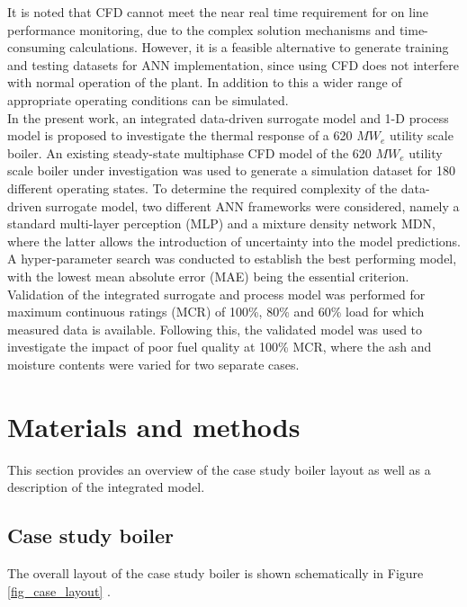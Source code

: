 \documentclass[a4paper,fleqn]{cas-sc}
\begin{document}
It is noted that CFD cannot meet the near real time requirement for on line performance monitoring, due to the complex solution mechanisms and time-consuming calculations. However, it is a feasible alternative to generate training and testing datasets for ANN implementation, since using CFD does not interfere with normal operation of the plant. In addition to this a wider range of appropriate operating conditions can be simulated.\\
 
In the present work, an integrated data-driven surrogate model and 1-D process model is proposed to investigate the thermal response of a 620 $MW_e$ utility scale boiler. An existing steady-state multiphase CFD model \cite{Rawlins2021, INFUB2022} of the 620 $MW_e$ utility scale boiler under investigation was used to generate a simulation dataset for 180 different operating states. To determine the required complexity of the data-driven surrogate model, two different ANN frameworks were considered, namely a standard multi-layer perception (MLP) and a mixture density network MDN, where the latter allows the introduction of uncertainty into the model predictions. A hyper-parameter search was conducted to establish the best performing model, with the lowest mean absolute error (MAE) being the essential criterion. Validation of the integrated surrogate and process model was performed for maximum continuous ratings (MCR) of 100\%, 80\% and 60\% load for which measured data is available. Following this, the validated model was used to investigate the impact of poor fuel quality at 100\% MCR, where the ash and moisture contents were varied for two separate cases.
\newpage
\section{Materials and methods}
This section provides an overview of the case study boiler layout as well as a description of the integrated model.
\subsection{Case study boiler}
The overall layout of the case study boiler is shown schematically in Figure \ref{fig_case_layout} \cite{Rousseau2020}.
\end{document}
